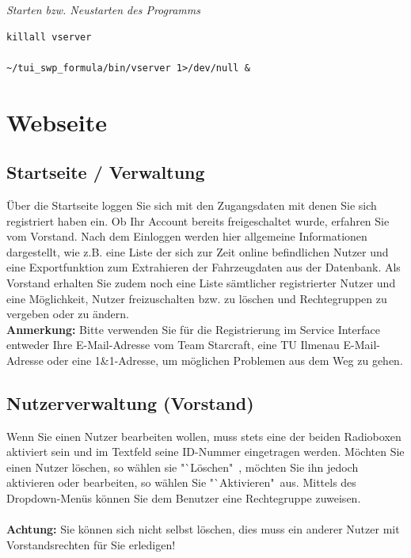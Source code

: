 \documentclass[fontsize = 12pt, paper = a4]{scrreprt}
\begin{document}
\textit{Starten bzw. Neustarten des Programms}

\vspace*{4mm}
\begin{lstlisting}[frame=single]
killall vserver

~/tui_swp_formula/bin/vserver 1>/dev/null &
\end{lstlisting} 
\vspace*{-2mm}




\section{Webseite}

\subsection{Startseite / Verwaltung}

Über die Startseite loggen Sie sich mit den Zugangsdaten mit denen Sie sich registriert haben ein. 
Ob Ihr Account bereits freigeschaltet wurde, erfahren Sie vom Vorstand. 
Nach dem Einloggen werden hier allgemeine Informationen dargestellt, wie z.B. eine Liste der sich zur Zeit online befindlichen Nutzer und eine Exportfunktion zum Extrahieren der Fahrzeugdaten aus der Datenbank. 
Als Vorstand erhalten Sie zudem noch eine Liste sämtlicher registrierter Nutzer und eine Möglichkeit, Nutzer freizuschalten bzw. zu löschen und Rechtegruppen zu vergeben oder zu ändern. \\

\textbf{Anmerkung:} Bitte verwenden Sie für die Registrierung im Service Interface entweder Ihre E-Mail-Adresse vom Team Starcraft, eine TU Ilmenau E-Mail-Adresse oder eine 1\&1-Adresse, um möglichen Problemen aus dem Weg zu gehen.

\newpage

\subsection{Nutzerverwaltung (Vorstand)}

Wenn Sie einen Nutzer bearbeiten wollen, muss stets eine der beiden Radioboxen aktiviert sein und im Textfeld seine ID-Nummer eingetragen werden. Möchten Sie einen Nutzer löschen, so wählen sie "`Löschen"\ , möchten Sie ihn jedoch aktivieren oder bearbeiten, so wählen Sie "`Aktivieren"\ aus. Mittels des Dropdown-Menüs können Sie dem Benutzer eine Rechtegruppe zuweisen. \\ \\
\textbf{Achtung:} Sie können sich nicht selbst löschen, dies muss ein anderer Nutzer mit Vorstandsrechten für Sie erledigen!
\end{document}
